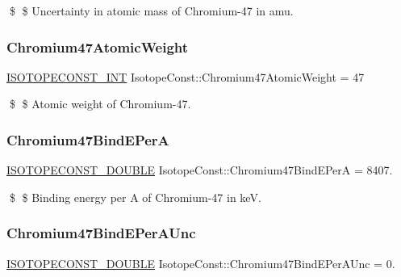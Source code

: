 \$ \$ Uncertainty in atomic mass of Chromium-\/47 in amu. \mbox{\label{group___isotope_const-_chromium-_cr47_ga213509251c5f1fff5fc4c1f5cd90b3ae}} 
\subsubsection{\texorpdfstring{Chromium47\+Atomic\+Weight}{Chromium47AtomicWeight}}
{\footnotesize\ttfamily \mbox{\hyperlink{group___isotope_const-_macros_ga5f18360b3e99483a35c32d789e62621c}{I\+S\+O\+T\+O\+P\+E\+C\+O\+N\+S\+T\+\_\+\+I\+NT}} Isotope\+Const\+::\+Chromium47\+Atomic\+Weight = 47}

\$ \$ Atomic weight of Chromium-\/47. \mbox{\label{group___isotope_const-_chromium-_cr47_gae39b3317c73b10525a684a12a880c160}} 
\subsubsection{\texorpdfstring{Chromium47\+Bind\+E\+PerA}{Chromium47BindEPerA}}
{\footnotesize\ttfamily \mbox{\hyperlink{group___isotope_const-_macros_ga8f45a7272ce02c0b4c65c44636ed719a}{I\+S\+O\+T\+O\+P\+E\+C\+O\+N\+S\+T\+\_\+\+D\+O\+U\+B\+LE}} Isotope\+Const\+::\+Chromium47\+Bind\+E\+PerA = 8407.}

\$ \$ Binding energy per A of Chromium-\/47 in keV. \mbox{\label{group___isotope_const-_chromium-_cr47_ga5a4d20bb6a564f0dcc8e3f3f769d1d14}} 
\subsubsection{\texorpdfstring{Chromium47\+Bind\+E\+Per\+A\+Unc}{Chromium47BindEPerAUnc}}
{\footnotesize\ttfamily \mbox{\hyperlink{group___isotope_const-_macros_ga8f45a7272ce02c0b4c65c44636ed719a}{I\+S\+O\+T\+O\+P\+E\+C\+O\+N\+S\+T\+\_\+\+D\+O\+U\+B\+LE}} Isotope\+Const\+::\+Chromium47\+Bind\+E\+Per\+A\+Unc = 0.}


